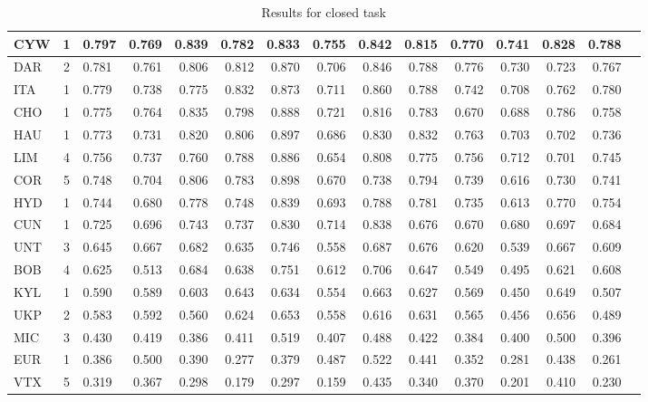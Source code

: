 \documentclass[11pt,letterpaper]{article}
\begin{document}
\begin{table*}[!htbp]
\begin{footnotesize}
\begin{tabular}{|p{1cm}|c|p{1cm}|r|r|r|r|r|r|r|r|r|r|r|r|}
 CYW  & 1  & 0.797 & 0.769 & 0.839 & 0.782 & 0.833 & 0.755 & 0.842 & 0.815 & 0.770 & 0.741 & 0.828 & 0.788\\\hline
DAR   & 2  & 0.781 & 0.761 & 0.806 & 0.812 & 0.870 & 0.706 & 0.846 & 0.788 & 0.776 & 0.730 & 0.723 & 0.767\\\hline
 ITA  & 1  & 0.779 & 0.738 & 0.775 & 0.832 & 0.873 & 0.711 & 0.860 & 0.788 & 0.742 & 0.708 & 0.762 & 0.780\\\hline
CHO  & 1  & 0.775 & 0.764 & 0.835 & 0.798 & 0.888 & 0.721 & 0.816 & 0.783 & 0.670 & 0.688 & 0.786 & 0.758\\\hline
HAU  & 1  & 0.773 & 0.731 & 0.820 & 0.806 & 0.897 & 0.686 & 0.830 & 0.832 & 0.763 & 0.703 & 0.702 & 0.736\\\hline
LIM   & 4  & 0.756 & 0.737 & 0.760 & 0.788 & 0.886 & 0.654 & 0.808 & 0.775 & 0.756 & 0.712 & 0.701 & 0.745\\\hline
 COR  & 5  & 0.748 & 0.704 & 0.806 & 0.783 & 0.898 & 0.670 & 0.738 & 0.794 & 0.739 & 0.616 & 0.730 & 0.741\\\hline
 HYD  & 1  & 0.744 & 0.680 & 0.778 & 0.748 & 0.839 & 0.693 & 0.788 & 0.781 & 0.735 & 0.613 & 0.770 & 0.754\\\hline
 CUN  & 1  & 0.725 & 0.696 & 0.743 & 0.737 & 0.830 & 0.714 & 0.838 & 0.676 & 0.670 & 0.680 & 0.697 & 0.684\\\hline
  UNT & 3  & 0.645 & 0.667 & 0.682 & 0.635 & 0.746 & 0.558 & 0.687 & 0.676 & 0.620 & 0.539 & 0.667 & 0.609\\\hline
BOB   & 4  & 0.625 & 0.513 & 0.684 & 0.638 & 0.751 & 0.612 & 0.706 & 0.647 & 0.549 & 0.495 & 0.621 & 0.608\\\hline
KYL  & 1  & 0.590 & 0.589 & 0.603 & 0.643 & 0.634 & 0.554 & 0.663 & 0.627 & 0.569 & 0.450 & 0.649 & 0.507\\\hline
 UKP  & 2  & 0.583 & 0.592 & 0.560 & 0.624 & 0.653 & 0.558 & 0.616 & 0.631 & 0.565 & 0.456 & 0.656 & 0.489\\\hline
 MIC  & 3  & 0.430 & 0.419 & 0.386 & 0.411 & 0.519 & 0.407 & 0.488 & 0.422 & 0.384 & 0.400 & 0.500 & 0.396\\\hline
EUR   & 1  & 0.386 & 0.500 & 0.390 & 0.277 & 0.379 & 0.487 & 0.522 & 0.441 & 0.352 & 0.281 & 0.438 & 0.261\\\hline
 VTX & 5  & 0.319 & 0.367 & 0.298 & 0.179 & 0.297 & 0.159 & 0.435 & 0.340 & 0.370 & 0.201 & 0.410 & 0.230\\\hline
\end{tabular}
\caption{Results for closed task\label{tab:results:closed}}
\end{footnotesize}
\end{table*}
\end{document}
